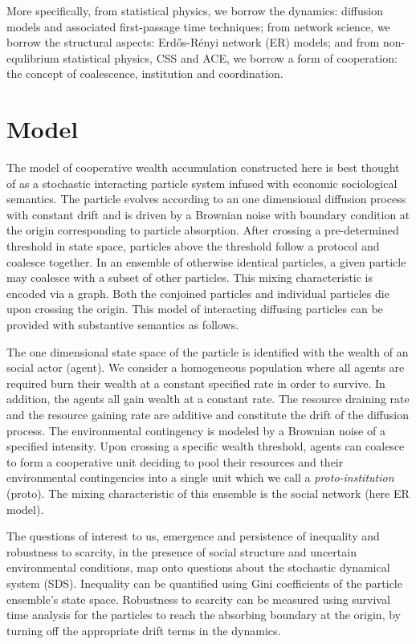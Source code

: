 \documentclass[sigconf]{acmart}
\begin{document}
More specifically, from statistical physics, we borrow the dynamics: diffusion models and associated first-passage time techniques; from network science, we borrow the structural aspects: Erd\H{o}s-R\'{e}nyi network (ER) models; and from non-equlibrium statistical physics, CSS and ACE, we borrow a form of cooperation: the concept of coalescence, institution and coordination. 


\section{Model}
The model of cooperative wealth accumulation constructed here is best thought of as a stochastic interacting particle system infused with economic sociological semantics. The particle evolves according to an one dimensional diffusion process with constant drift and is driven by a Brownian noise with boundary condition at the origin corresponding to particle absorption. After crossing a pre-determined threshold in state space, particles above the threshold follow a protocol and coalesce together. In an ensemble of otherwise identical particles, a given particle may coalesce with a subset of other particles. This mixing characteristic is encoded via a graph. Both the conjoined particles and individual particles die upon crossing the origin. This model of interacting diffusing particles can be provided with substantive semantics as follows. 

The one dimensional state space of the particle is identified with the wealth of an social actor (agent). We consider a homogeneous population where all agents are required burn their wealth at a constant specified rate in order to survive. In addition, the agents all gain wealth at a constant rate. The resource draining rate and the resource gaining rate are additive and constitute the drift of the diffusion process. The environmental contingency is modeled by a Brownian noise of a specified intensity. Upon crossing a specific wealth threshold, agents can coalesce to form a cooperative unit deciding to pool their resources and their environmental contingencies into a single unit which we call a \textit{proto-institution} (proto). The mixing characteristic of this ensemble is the social network (here ER model).          

The questions of interest to us, emergence and persistence of inequality and robustness to scarcity, in the presence of social structure and uncertain environmental conditions, map onto questions about the stochastic dynamical system (SDS). Inequality can be quantified using Gini coefficients of the particle ensemble's state space. Robustness to scarcity can be measured using survival time analysis for the particles to reach the absorbing boundary at the origin, by turning off the appropriate drift terms in the dynamics. 
\end{document}

